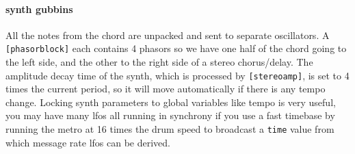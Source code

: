 \paragraph{synth gubbins}
All the notes from the chord are unpacked and sent to separate oscillators.
A \verb+[phasorblock]+ each contains 4 phasors so we have one half of
the chord going to the left side, and the other to the right side
of a stereo chorus/delay. The amplitude decay time of the synth, which
is processed by \verb+[stereoamp]+, is set to
4 times the current period, so it will move automatically if there
is any tempo change. Locking synth parameters to global variables
like tempo is very useful, you may have many lfos all running
in synchrony if you use a fast timebase by running the metro
at 16 times the drum speed to broadcast a \verb+time+ value from
which message rate lfos can be derived.
  
